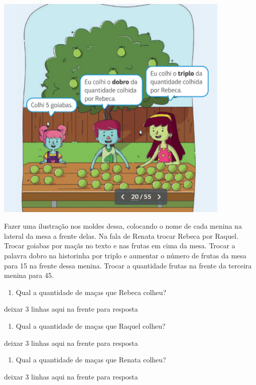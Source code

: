 \includegraphics[width=4.42538in,height=4.30871in]{media/image24.png}

Fazer uma ilustração nos moldes dessa, colocando o nome de cada menina
na lateral da mesa a frente delas. Na fala de Renata trocar Rebeca por
Raquel. Trocar goiabas por maçãs no texto e nas frutas em cima da mesa.
Trocar a palavra dobro na historinha por triplo e aumentar o número de
frutas da mesa para 15 na frente dessa menina. Trocar a quantidade
frutas na frente da terceira menina para 45.

\begin{enumerate}
\def\labelenumi{\alph{enumi})}
\item
  Qual a quantidade de maças que Rebeca colheu?
\end{enumerate}

deixar 3 linhas aqui na frente para resposta

\begin{enumerate}
\def\labelenumi{\alph{enumi})}
\item
  Qual a quantidade de maças que Raquel colheu?
\end{enumerate}

deixar 3 linhas aqui na frente para resposta

\begin{enumerate}
\def\labelenumi{\alph{enumi})}
\item
  Qual a quantidade de maças que Renata colheu?
\end{enumerate}

deixar 3 linhas aqui na frente para resposta

